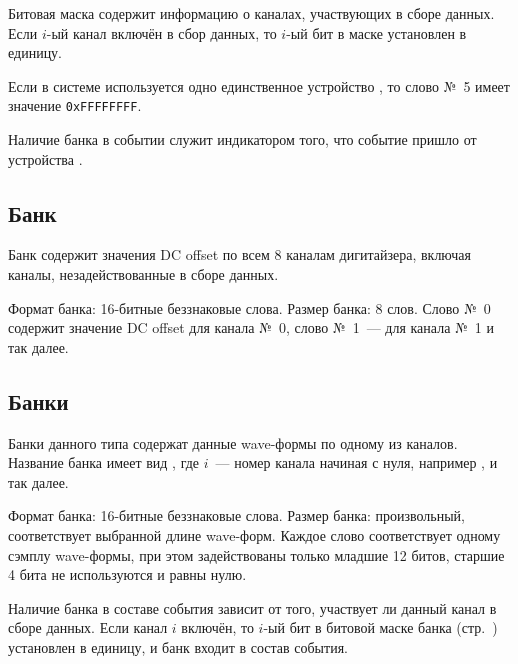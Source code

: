Битовая маска содержит информацию о каналах, участвующих в сборе данных. Если $i$-ый канал включён в сбор данных, то $i$-ый бит в маске установлен в единицу.

Если в системе используется одно единственное устройство \DEVICE{}, то слово №~5 имеет значение {\tt 0xFFFFFFFF}.

Наличие банка  в событии служит индикатором того, что событие пришло от устройства \DEVICE{}.

\subsection{Банк }

Банк содержит значения DC offset \cite{CaenUM3051AIS} по всем 8 каналам дигитайзера, включая каналы, незадействованные в сборе данных.

Формат банка: 16-битные беззнаковые слова. Размер банка: 8 слов. Слово №~0 содержит значение DC offset для канала №~0, слово №~1~--- для канала №~1 и так далее.

\subsection{Банки }

Банки данного типа  содержат данные wave-формы по одному из каналов. Название банка имеет вид , где $i$~--- номер канала начиная с нуля, например ,  и так далее.

Формат банка: 16-битные беззнаковые слова. Размер банка: произвольный, соответствует выбранной длине wave-форм. Каждое слово соответствует одному сэмплу wave-формы, при этом задействованы только младшие 12 битов, старшие 4 бита не используются и равны нулю.

Наличие банка в составе события зависит от того, участвует ли данный канал в сборе данных. Если канал $i$ включён, то $i$-ый бит в битовой маске банка  (стр.~\pageref{sec_bank_info}) установлен в единицу, и банк  входит в состав события.





